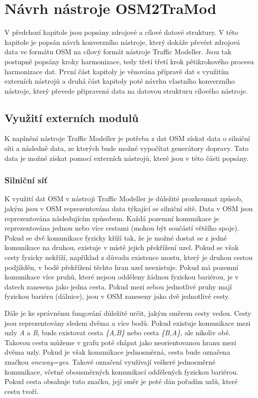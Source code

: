 
\chapter{Návrh nástroje OSM2TraMod}
\label{navrh_nastroje}

V předchozí kapitole jsou popsány zdrojové a cílové datové struktury. V této kapitole je popsán návrh konverzního nástroje, který dokáže převést zdrojová data ve formátu OSM na cílový formát nástroje Traffic Modeller. Jsou tak postupně popsány kroky harmonizace, tedy třetí třetí krok pětikrokového procesu harmonizace dat. První část kapitoly je věnována přípravě dat s využitím externích nástrojů a druhá část kapitoly poté návrhu vlastního konverzního nástroje, který převede připravená data na datovou strukturu cílového nástroje.

\section{Využití externích modulů}

K naplnění nástroje Traffic Modeller je potřeba z dat OSM získat data o silniční síti a následně data, ze kterých bude možné vypočítat generátory dopravy. Tato data je možné získat pomocí externích nástrojů, které jsou v této části popsány. 

\subsection{Silniční síť}

K využití dat OSM v nástroji Traffic Modeller je důležité prozkoumat způsob, jakým jsou v OSM reprezentována data týkající se silniční sítě. Data v OSM jsou reprezentována následujícím způsobem. Každá pozemní komunikace je reprezentována jednou nebo více cestami (mohou být součástí většího spoje). Pokud se dvě komunikace fyzicky kříží tak, že je možné dostat se z jedné komunikace na druhou, existuje v místě jejich překřížení uzel. Pokud se však cesty fyzicky nekříží, například z důvodu existence mostu, který je druhou cestou podjížděn, v bodě překřížení těchto hran uzel neexistuje. Pokud má pozemní komunikace více pruhů, které nejsou odděleny žádnou fyzickou bariérou, je v datech zanesena jako jedna cesta. Pokud mezi sebou jednotlivé pruhy mají fyzickou bariéru (dálnice), jsou v OSM zaneseny jako dvě jednotlivé cesty.

Dále je ke správnému fungování důležité určit, jakým směrem cesty vedou. Cesty jsou reprezentovány sledem dvěma a více bodů. Pokud existuje komunikace mezi uzly \textit{A} a \textit{B}, bude existovat cesta \textit{\{A,B\}} nebo cesta \textit{\{B,A\}}, ale nikoliv obě. Takovou cestu můžeme v grafu poté chápat jako neorientovanou hranu mezi dvěma uzly. Pokud je však komunikace jednosměrná, cesta bude označena značkou \textit{oneway=yes}. Takové označení využívají veškeré jednosměrné komunikace, včetně obousměrných komunikací oddělených fyzickou bariérou. Pokud cesta obsahuje tuto značku, její směr je poté dán pořadím uzlů, které cestu tvoří. 

